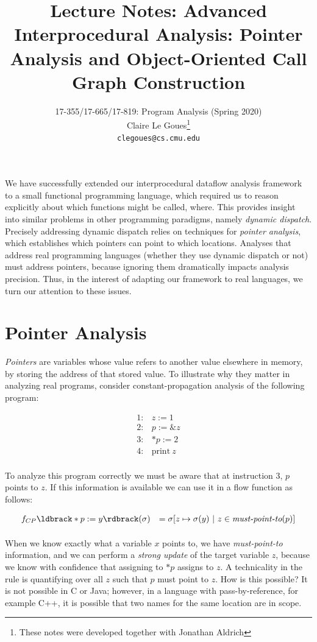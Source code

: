 \documentclass[11pt]{article}
\title{Lecture Notes:
		Advanced Interprocedural Analysis: Pointer Analysis and Object-Oriented Call Graph Construction}
\author{17-355/17-665/17-819: Program Analysis (Spring 2020)\\
        Claire Le Goues\footnote{These notes were developed together with Jonathan Aldrich}\\
		{\tt clegoues@cs.cmu.edu}}
\date{}
\begin{document}
\maketitle

We have successfully extended our interprocedural dataflow analysis framework to
a small functional programming language, which required us to reason explicitly
about which functions might be called, where. This provides insight into similar
problems in other programming paradigms, namely \emph{dynamic dispatch}.
Precisely addressing dynamic dispatch relies on techniques for \emph{pointer
  analysis}, which establishes which pointers can point to which locations.
Analyses that address real programming languages (whether they use dynamic
dispatch or not) must address pointers, because ignoring them dramatically
impacts analysis precision. Thus, in the interest of adapting our framework to
real languages, we turn our attention to these issues.

\section{Pointer Analysis}

\emph{Pointers} are variables whose value refers to another value elsewhere in
memory, by storing the address of that stored value. To illustrate why they
matter in analyzing real programs, consider constant-propagation analysis of the
following program:

\[
\begin{array}{ll}
1: & z := 1\\
2: & p := \&z\\
3: & *p := 2\\
4: & \mbox{print}~ z\\
\end{array}
\]

\noindent To analyze this program correctly we must be aware that at instruction 3, $p$ points to $z$.  If this information is available we can use it in a flow function as follows:

\[
\begin{array}{ll}

f_{CP}\parg{*p := y}(\sigma) & = \sigma[z \mapsto \sigma(y) ~|~ z \in \textit{must-point-to}(p)]\\[1ex]

\end{array}
\]

When we know exactly what a variable $x$ points to, we have \textit{must-point-to} information, and we can perform a \textit{strong update} of the target variable $z$, because we know with confidence that assigning to $*p$ assigns to $z$.  A technicality in the rule is quantifying over all $z$ such that $p$ must point to $z$.  How is this possible?  It is not possible in C or Java; however, in a language with pass-by-reference, for example C++, it is possible that two names for the same location are in scope.
\end{document}
